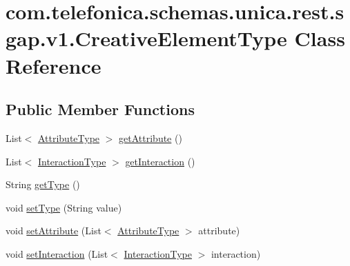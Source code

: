 \hypertarget{classcom_1_1telefonica_1_1schemas_1_1unica_1_1rest_1_1sgap_1_1v1_1_1CreativeElementType}{
\section{com.telefonica.schemas.unica.rest.sgap.v1.CreativeElementType Class Reference}
\label{classcom_1_1telefonica_1_1schemas_1_1unica_1_1rest_1_1sgap_1_1v1_1_1CreativeElementType}
}
\subsection*{Public Member Functions}
\begin{DoxyCompactItemize}
\item 
List$<$ \hyperlink{classcom_1_1telefonica_1_1schemas_1_1unica_1_1rest_1_1sgap_1_1v1_1_1AttributeType}{AttributeType} $>$ \hyperlink{classcom_1_1telefonica_1_1schemas_1_1unica_1_1rest_1_1sgap_1_1v1_1_1CreativeElementType_a45699605e484e3f212773c35f02743e0}{getAttribute} ()
\item 
List$<$ \hyperlink{classcom_1_1telefonica_1_1schemas_1_1unica_1_1rest_1_1sgap_1_1v1_1_1InteractionType}{InteractionType} $>$ \hyperlink{classcom_1_1telefonica_1_1schemas_1_1unica_1_1rest_1_1sgap_1_1v1_1_1CreativeElementType_a9874e46fdc0bcb14c07abb9f68b45165}{getInteraction} ()
\item 
String \hyperlink{classcom_1_1telefonica_1_1schemas_1_1unica_1_1rest_1_1sgap_1_1v1_1_1CreativeElementType_a0b8be0c1b3de0fb49f99addd30b0722c}{getType} ()
\item 
void \hyperlink{classcom_1_1telefonica_1_1schemas_1_1unica_1_1rest_1_1sgap_1_1v1_1_1CreativeElementType_a2d1c39eb4462ac84604c918453931fa9}{setType} (String value)
\item 
void \hyperlink{classcom_1_1telefonica_1_1schemas_1_1unica_1_1rest_1_1sgap_1_1v1_1_1CreativeElementType_a49046374aed087f99738aab9ed2b580c}{setAttribute} (List$<$ \hyperlink{classcom_1_1telefonica_1_1schemas_1_1unica_1_1rest_1_1sgap_1_1v1_1_1AttributeType}{AttributeType} $>$ attribute)
\item 
void \hyperlink{classcom_1_1telefonica_1_1schemas_1_1unica_1_1rest_1_1sgap_1_1v1_1_1CreativeElementType_a56884b3215979f9d0d6a660293eb5547}{setInteraction} (List$<$ \hyperlink{classcom_1_1telefonica_1_1schemas_1_1unica_1_1rest_1_1sgap_1_1v1_1_1InteractionType}{InteractionType} $>$ interaction)
\end{DoxyCompactItemize}
